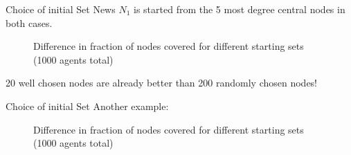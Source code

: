 \documentclass{beamer}
\begin{document}
\begin{frame}{Choice of initial Set}
    News $N_1$ is started from the 5 most degree central nodes in both cases.
    \begin{figure}
      \centering
      \qquad
    \caption{Difference in fraction of nodes covered for different starting sets (1000 agents total)}
    \end{figure}
    20 well chosen nodes are already better than 200 randomly chosen nodes!
\end{frame}

\begin{frame}{Choice of initial Set}
    Another example:
    \begin{figure}
      \centering
      \qquad
    \caption{Difference in fraction of nodes covered for different starting sets (1000 agents total)}
    \end{figure}
\end{frame}
\end{document}
